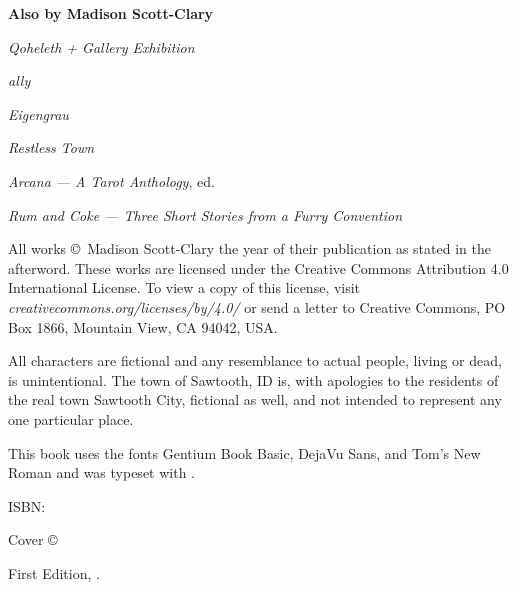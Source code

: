 
\thispagestyle{empty}
\null
\vfill
\begin{center}
    \textbf{Also by Madison Scott-Clary}

    \emph{Qoheleth + Gallery Exhibition}

    \emph{ally}

    \emph{Eigengrau}

    \emph{Restless Town}

    \emph{Arcana --- A Tarot Anthology}, ed.

    \emph{Rum and Coke --- Three Short Stories from a Furry Convention}
\end{center}
\vfill
\singlespacing
{\small\parindent0pt\parskip5pt
\noindent All works \copyright\ Madison Scott-Clary the year of their publication as stated in the afterword. These works are licensed under the Creative Commons Attribution 4.0 International License. To view a copy of this license, visit \mbox{\emph{creativecommons.org/licenses/by/4.0/}} or send a letter to Creative Commons, PO Box 1866, Mountain View, CA 94042, USA.

All characters are fictional and any resemblance to actual people, living or dead, is unintentional. The town of Sawtooth, ID is, with apologies to the residents of the real town Sawtooth City, fictional as well, and not intended to represent any one particular place.

This book uses the fonts Gentium Book Basic, DejaVu Sans, and Tom's New Roman and was typeset with {\XeLaTeX}.

\vspace{1ex}

ISBN: \ISBN

\vspace{1ex}

\emph{\Title}

\vspace{1ex}

Cover \copyright\ \Year\ \Illustrator\\
\IllustratorWeb

\vspace{1ex}

First Edition, \Year.
}

\cleardoublepage
